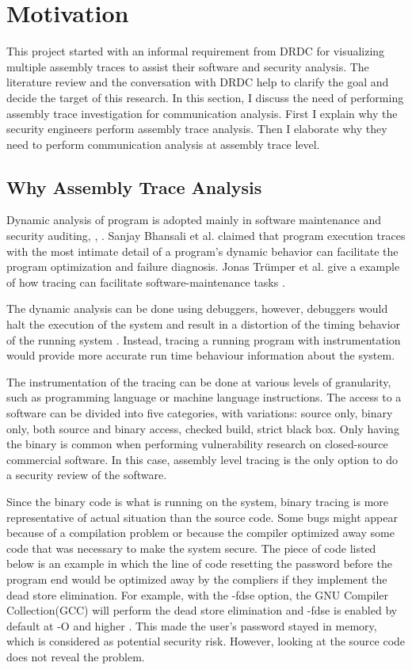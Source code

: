 \section{Motivation}
This project started with an informal requirement from DRDC for visualizing multiple assembly traces to assist their software and security analysis. The literature review and the conversation with DRDC help to clarify the goal and decide the target of this research. In this section, I discuss the need of performing assembly trace investigation for communication analysis. First I explain why the security engineers perform assembly trace analysis. Then I elaborate why they need to perform communication analysis at assembly trace level. 

\subsection{Why Assembly Trace Analysis}
Dynamic analysis of program is adopted mainly in software maintenance and security auditing\cite{zhang2010detecting}, \cite{cai2016sworddta}, \cite{somorovsky2016systematic}. Sanjay Bhansali et al. claimed that program execution traces with the most intimate detail of a program's dynamic behavior can facilitate the program optimization and failure diagnosis. Jonas Tr{\"u}mper et al. give a example of how tracing can facilitate software-maintenance tasks \cite{trumper2012maintenance}.

The dynamic analysis can be done using debuggers, however, debuggers would halt the execution of the system and result in a distortion of the timing behavior of the running system \cite{trumper2012maintenance}. Instead, tracing a running program with instrumentation would provide more accurate run time behaviour information about the system. 

The instrumentation of the tracing can be done at various levels of granularity, such as programming language or machine language instructions. The access to a software can be divided into five categories, with variations: source only, binary only, both source and binary access, checked build, strict black box. Only having the binary is common when performing vulnerability research on closed-source commercial software\cite{dowd_art_2006}. In this case, assembly level tracing is the only option to do a security review of the software.

Since the binary code is what is running on the system, binary tracing is more representative of actual situation than the source code.  Some bugs might appear because of a compilation problem or because the compiler optimized away some code that was
necessary to make the system secure. The piece of code listed below is an example in which the line of code resetting the password before the program end would be optimized away by the compliers if they implement the dead store elimination\cite{howard2003writing}. For example, with the -fdse option, the GNU Compiler Collection(GCC) will perform the dead store elimination and -fdse is enabled by default at -O and higher \cite{gcc}. This made the user's password stayed in memory, which is considered as potential security risk. However, looking at the source code does not reveal the problem.

